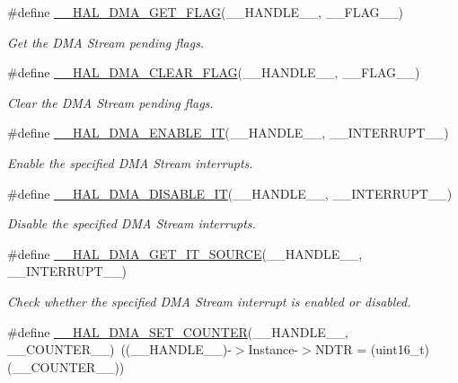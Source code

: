\begin{DoxyCompactItemize}
\#define \hyperlink{group___d_m_a_ga798d4b3b3fbd32b95540967bb35b35be}{\+\_\+\+\_\+\+H\+A\+L\+\_\+\+D\+M\+A\+\_\+\+G\+E\+T\+\_\+\+F\+L\+AG}(\+\_\+\+\_\+\+H\+A\+N\+D\+L\+E\+\_\+\+\_\+,  \+\_\+\+\_\+\+F\+L\+A\+G\+\_\+\+\_\+)
\begin{DoxyCompactList}\small\item\em Get the D\+MA Stream pending flags. \end{DoxyCompactList}\item 
\#define \hyperlink{group___d_m_a_gabc041fb1c85ea7a3af94e42470ef7f2a}{\+\_\+\+\_\+\+H\+A\+L\+\_\+\+D\+M\+A\+\_\+\+C\+L\+E\+A\+R\+\_\+\+F\+L\+AG}(\+\_\+\+\_\+\+H\+A\+N\+D\+L\+E\+\_\+\+\_\+,  \+\_\+\+\_\+\+F\+L\+A\+G\+\_\+\+\_\+)
\begin{DoxyCompactList}\small\item\em Clear the D\+MA Stream pending flags. \end{DoxyCompactList}\item 
\#define \hyperlink{group___d_m_a_ga2124233229c04ca90b790cd8cddfa98b}{\+\_\+\+\_\+\+H\+A\+L\+\_\+\+D\+M\+A\+\_\+\+E\+N\+A\+B\+L\+E\+\_\+\+IT}(\+\_\+\+\_\+\+H\+A\+N\+D\+L\+E\+\_\+\+\_\+,  \+\_\+\+\_\+\+I\+N\+T\+E\+R\+R\+U\+P\+T\+\_\+\+\_\+)
\begin{DoxyCompactList}\small\item\em Enable the specified D\+MA Stream interrupts. \end{DoxyCompactList}\item 
\#define \hyperlink{group___d_m_a_ga2867eab09398df2daac55c3f327654da}{\+\_\+\+\_\+\+H\+A\+L\+\_\+\+D\+M\+A\+\_\+\+D\+I\+S\+A\+B\+L\+E\+\_\+\+IT}(\+\_\+\+\_\+\+H\+A\+N\+D\+L\+E\+\_\+\+\_\+,  \+\_\+\+\_\+\+I\+N\+T\+E\+R\+R\+U\+P\+T\+\_\+\+\_\+)
\begin{DoxyCompactList}\small\item\em Disable the specified D\+MA Stream interrupts. \end{DoxyCompactList}\item 
\#define \hyperlink{group___d_m_a_ga206f24e6bee4600515b9b6b1ec79365b}{\+\_\+\+\_\+\+H\+A\+L\+\_\+\+D\+M\+A\+\_\+\+G\+E\+T\+\_\+\+I\+T\+\_\+\+S\+O\+U\+R\+CE}(\+\_\+\+\_\+\+H\+A\+N\+D\+L\+E\+\_\+\+\_\+,  \+\_\+\+\_\+\+I\+N\+T\+E\+R\+R\+U\+P\+T\+\_\+\+\_\+)
\begin{DoxyCompactList}\small\item\em Check whether the specified D\+MA Stream interrupt is enabled or disabled. \end{DoxyCompactList}\item 
\#define \hyperlink{group___d_m_a_ga448a8f809df86ccffae200ffd33d0a82}{\+\_\+\+\_\+\+H\+A\+L\+\_\+\+D\+M\+A\+\_\+\+S\+E\+T\+\_\+\+C\+O\+U\+N\+T\+ER}(\+\_\+\+\_\+\+H\+A\+N\+D\+L\+E\+\_\+\+\_\+,  \+\_\+\+\_\+\+C\+O\+U\+N\+T\+E\+R\+\_\+\+\_\+)~((\+\_\+\+\_\+\+H\+A\+N\+D\+L\+E\+\_\+\+\_\+)-\/$>$Instance-\/$>$N\+D\+TR = (uint16\+\_\+t)(\+\_\+\+\_\+\+C\+O\+U\+N\+T\+E\+R\+\_\+\+\_\+))

\end{DoxyCompactItemize}
